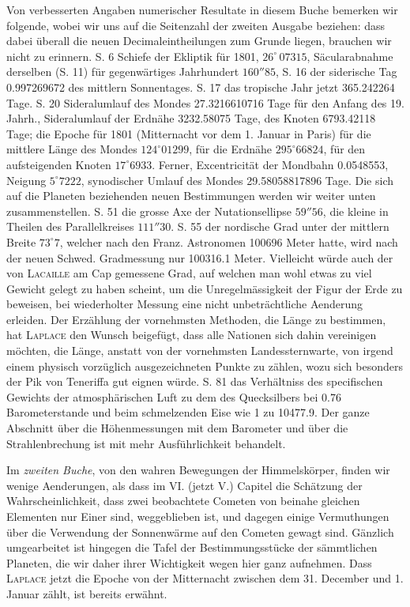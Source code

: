 Von verbesserten Angaben numerischer Resultate in diesem Buche bemerken wir folgende, wobei wir uns auf die Seitenzahl der zweiten Ausgabe beziehen: dass dabei überall die neuen Decimaleintheilungen zum Grunde liegen, brauchen wir nicht zu erinnern. S. 6 Schiefe der Ekliptik für 1801, $26^{\circ}\,07315$, Säcularabnahme derselben (S. 11) für gegenwärtiges Jahrhundert $160''85$, S. 16 der siderische Tag 0.997269672 des mittlern Sonnentages. S. 17 das tropische Jahr jetzt 365.242264 Tage. S. 20 Sideralumlauf des Mondes 27.3216610716 Tage für den Anfang des 19. Jahrh., Sideralumlauf der Erdnähe 3232.58075
 Tage, des Knoten 6793.42118 Tage; die Epoche für 1801 (Mitternacht vor dem 1. Januar in Paris) für die mittlere Länge des Mondes $124^{\circ}01299$, für die Erdnähe $295^{\circ}66824$, für den aufsteigenden Knoten $17^{\circ}6933$. Ferner, Excentricität der Mondbahn 0.0548553, Neigung $5^{\circ}7222$, synodischer Umlauf des Mondes 29.58058817896 Tage. Die sich auf die Planeten beziehenden neuen Bestimmungen werden wir weiter unten zusammenstellen. S. 51 die grosse Axe der Nutationsellipse $59''56$, die kleine in Theilen des Parallelkreises $111''30$. S. 55 der nordische Grad unter der mittlern Breite $73^{\circ}7$, welcher nach den Franz. Astronomen 100696 Meter hatte, wird nach der neuen Schwed. Gradmessung nur 100316.1 Meter. Vielleicht würde auch der von \textsc{Lacaille} am Cap gemessene Grad, auf welchen man wohl etwas zu viel Gewicht gelegt zu haben scheint, um die Unregelmässigkeit der Figur der Erde zu beweisen, bei wiederholter Messung eine nicht unbeträchtliche Aenderung erleiden. Der Erzählung der vornehmsten Methoden, die Länge zu bestimmen, hat \textsc{Laplace} den Wunsch beigefügt, dass alle Nationen sich dahin vereinigen möchten, die Länge, anstatt von der vornehmsten Landessternwarte, von irgend einem physisch vorzüglich ausgezeichneten Punkte zu zählen, wozu sich besonders der Pik von Teneriffa gut eignen würde. S. 81 das Verhältniss des specifischen Gewichts der atmosphärischen Luft zu dem des Quecksilbers bei 0.76 Barometerstande und beim schmelzenden Eise wie 1 zu 10477.9. Der ganze Abschnitt über die Höhenmessungen mit dem Barometer und über die Strahlenbrechung ist mit mehr Ausführlichkeit behandelt.

Im \emph{zweiten Buche}, von den wahren Bewegungen der Himmelskörper, finden wir wenige Aenderungen, als dass im VI. (jetzt V.) Capitel die Schätzung der Wahrscheinlichkeit, dass zwei beobachtete Cometen von beinahe gleichen Elementen nur Einer sind, weggeblieben ist, und dagegen einige Vermuthungen über die Verwendung der Sonnenwärme auf den Cometen gewagt sind. Gänzlich umgearbeitet ist hingegen die Tafel der Bestimmungsstücke der sämmtlichen Planeten, die wir daher ihrer Wichtigkeit wegen hier ganz aufnehmen. Dass \textsc{Laplace} jetzt die Epoche von der Mitternacht zwischen dem 31. December und 1. Januar zählt, ist bereits erwähnt.

